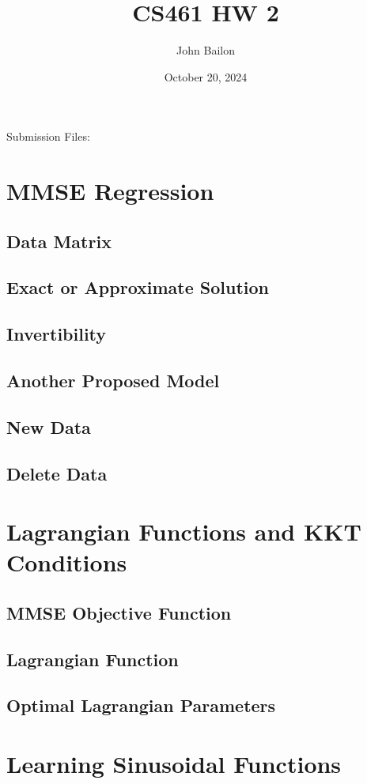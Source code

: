\documentclass{article}
\title{CS461 HW 2}
\author{John Bailon}
\date{October 20, 2024}
\begin{document}
\maketitle

\noindent
Submission Files:

\section{MMSE Regression}
\subsection{Data Matrix}
\subsection{Exact or Approximate Solution}
\subsection{Invertibility}
\subsection{Another Proposed Model}
\subsection{New Data}
\subsection{Delete Data}

\section{Lagrangian Functions and KKT Conditions}
\subsection{MMSE Objective Function}
\subsection{Lagrangian Function}
\subsection{Optimal Lagrangian Parameters}

\section{Learning Sinusoidal Functions}
\end{document}

